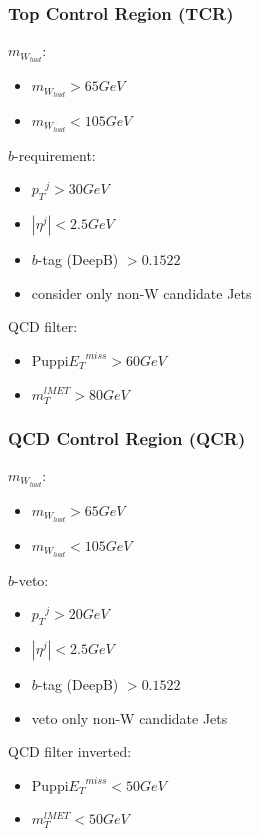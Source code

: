 \documentclass{beamer}
\begin{document}
\begin{frame}
    \frametitle{Top Control Region (TCR)}
    ${m_{W_{had}}}$:
    \begin{itemize}
        \item ${m_{W_{had}}} > 65 GeV$
        \item ${m_{W_{had}}} < 105 GeV$
    \end{itemize}
    $b$-requirement:
    \begin{itemize}
       \item ${p_{T}}^{j} > 30 GeV$ 
       \item $|{\eta}^{j}| < 2.5 GeV$
       \item $b$-tag (DeepB) $>  0.1522$  
       \item consider only non-W candidate Jets  
    \end{itemize}
    QCD filter:
    \begin{itemize}
        \item Puppi${{E}_{T}}^{miss} > 60 GeV$ 
        \item $m_{T}^{lMET} > 80 GeV$ 
    \end{itemize}
\end{frame}

\begin{frame}
    \frametitle{QCD Control Region (QCR)}
    ${m_{W_{had}}}$:
    \begin{itemize}
        \item ${m_{W_{had}}} > 65 GeV$
        \item ${m_{W_{had}}} < 105 GeV$
    \end{itemize}
    $b$-veto:
    \begin{itemize}
       \item ${p_{T}}^{j} > 20 GeV$ 
       \item $|{\eta}^{j}| < 2.5 GeV$
       \item $b$-tag (DeepB) $>  0.1522$  
       \item veto only non-W candidate Jets  
    \end{itemize}
    QCD filter inverted:
    \begin{itemize}
        \item Puppi${{E}_{T}}^{miss} < 50 GeV$ 
        \item $m_{T}^{lMET} < 50 GeV$ 
    \end{itemize}
\end{frame}
\end{document}
